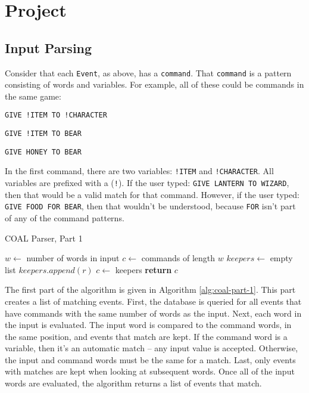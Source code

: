 \documentclass{article}
\newcommand{\enterProblemHeader}[1]{
}
\newcommand{\exitProblemHeader}[1]{
\nobreak\extramarks{#1}{}\nobreak
}
\newcounter{homeworkProblemCounter} %
\newcommand{\homeworkProblemName}{}
\newenvironment{homeworkProblem}[1][Problem \arabic{homeworkProblemCounter}]{ %
\stepcounter{homeworkProblemCounter} %
\renewcommand{\homeworkProblemName}{#1} %
\section{\homeworkProblemName} %
\enterProblemHeader{\homeworkProblemName} %
}{
\exitProblemHeader{\homeworkProblemName} %
}
\newcommand{\homeworkSectionName}{}
\newenvironment{homeworkSection}[1]{ %
\renewcommand{\homeworkSectionName}{#1} %
\subsection{\homeworkSectionName} %
\enterProblemHeader{\homeworkProblemName\ [\homeworkSectionName]} %
}{
\enterProblemHeader{\homeworkProblemName} %
}
\begin{document}
\begin{homeworkProblem}[Project]
\begin{homeworkSection}{Input Parsing}
	Consider that each \texttt{Event}, as above, has a \texttt{command}. That \texttt{command} is a pattern consisting of words and variables. For example, all of these could be commands in the same game:

	\begin{compactitem}
		\item \texttt{GIVE !ITEM TO !CHARACTER}
		\item \texttt{GIVE !ITEM TO BEAR}
		\item \texttt{GIVE HONEY TO BEAR}
	\end{compactitem}

	In the first command, there are two variables: \texttt{!ITEM} and \texttt{!CHARACTER}. All variables are prefixed with a (\texttt{!}). If the user typed: \texttt{GIVE LANTERN TO WIZARD}, then that would be a valid match for that command. However, if the user typed: \texttt{GIVE FOOD FOR BEAR}, then that wouldn't be understood, because \texttt{FOR} isn't part of any of the command patterns.

	\begin{algorithm}
		\caption{COAL Parser, Part 1}
		\label{alg:coal-part-1}
		\begin{algorithmic}
				\State $w \gets$ number of words in input
				\State $c \gets$ commands of length $w$
					\State $keepers \gets$ empty list
							\State $keepers.append(r)$
						\EndIf
					\EndFor
					\State $c \gets$ keepers
				\EndFor
				\State \textbf{return} $c$
			\EndProcedure
	\end{algorithmic}
	\end{algorithm}

	The first part of the algorithm is given in Algorithm \ref{alg:coal-part-1}. This part creates a list of matching events. First, the database is queried for all events that have commands with the same number of words as the input. Next, each word in the input is evaluated. The input word is compared to the command words, in the same position, and events that match are kept. If the command word is a variable, then it's an automatic match -- any input value is accepted. Otherwise, the input and command words must be the same for a match. Last, only events with matches are kept when looking at subsequent words. Once all of the input words are evaluated, the algorithm returns a list of events that match.
	

\end{homeworkSection}
\end{homeworkProblem}
\end{document}
